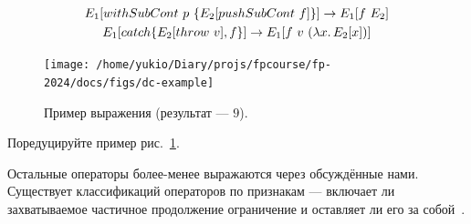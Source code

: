 \begin{gather*}
    E_1[withSubCont ~ p ~ \{E_2[pushSubCont ~ f]\}] \to E_1[f ~ E_2]
    \\
    E_1[catch\{E_2[throw ~ v], f\}] \to E_1[f ~ v ~ (\lambda x\ldotp E_2[x])]
\end{gather*}

\begin{figure}[h]
    \centering
    \texttt{[image: /home/yukio/Diary/projs/fpcourse/fp-2024/docs/figs/dc-example]}
    \caption{Пример выражения (результат --- $9$).}
    \label{fig:dc-example}
\end{figure}

\begin{task}
    Поредуцируйте пример рис.~\ref{fig:dc-example}.
\end{task}

Остальные операторы более-менее выражаются через обсуждённые нами.
Существует классификаций операторов по признакам --- включает ли захватываемое частичное продолжение ограничение и оставляет ли его за собой~\cite{dyvbig2007monadic}.











